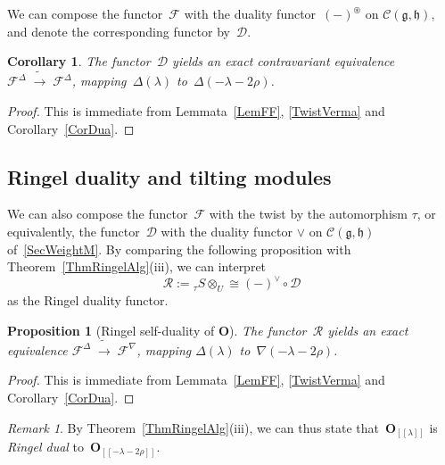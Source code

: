 \documentclass[11pt]{amsart}
\newcommand{\lbra}{[\![}
\newcommand{\rbra}{]\!]}
\newcommand{\FF}{\mathscr{F}}
\newcommand{\RR}{\mathscr{R}}
\newcommand{\DD}{\mathscr{D}}
\newcommand{\cF}{{\mathcal{F}}}
\newcommand{\bO}{\mathbf{O}}
\newcommand{\cC}{\mathcal{C}}
\newcommand{\fg}{\mathfrak{g}}
\newcommand{\fh}{\mathfrak{h}}
\numberwithin{equation}{section}
\theoremstyle{plain}
\newtheorem{prop}[subsubsection]{Proposition}
\newtheorem{cor}[subsubsection]{Corollary}
\theoremstyle{remark}
\newtheorem{rem}[subsubsection]{Remark}
\theoremstyle{remark}
\theoremstyle{construction}
\begin{document}
We can compose the functor~$\FF$ with the duality functor~$(-)^\circledast$ on $\cC(\fg,\fh)$, {and} denote the corresponding functor by~$\DD$. 

\begin{cor}${}$\label{PropRD}
The functor~$\DD$ yields an exact contravariant equivalence ${\cF}^{\Delta}\;\tilde\to\;{\cF}^{\Delta}$, mapping~$\Delta(\lambda)$ to~$\Delta(-\lambda-2\rho)$.
\end{cor}
\begin{proof}
This is immediate from Lemmata~\ref{LemFF}, \ref{TwistVerma} and Corollary~\ref{CorDua}.
\end{proof}

\subsection{Ringel duality and tilting modules}

We can also compose the functor~$\FF$ with the twist by the automorphism $\tau$, or equivalently, the functor~$\DD$ with the duality functor $\vee$ on $\cC(\fg,\fh)$ of~\ref{SecWeightM}. By comparing the following proposition with Theorem~\ref{ThmRingelAlg}(iii), we can interpret 
$$\RR:={}_{\tau}S\otimes_U\cong (-)^\vee\circ\DD$$ as the Ringel duality functor.
\begin{prop}[Ringel self-duality of $\bO$] \label{PropRD}
 The functor~$\RR$ yields an exact equivalence ${\cF}^{\Delta}\;\tilde\to\;{\cF}^{\nabla}$, mapping $\Delta(\lambda)$ to~$\nabla(-\lambda-2\rho)$.
\end{prop}
\begin{proof}
This is immediate from Lemmata~\ref{LemFF}, \ref{TwistVerma} and Corollary~\ref{CorDua}.
\end{proof}


\begin{rem}
By Theorem~\ref{ThmRingelAlg}(iii), we can thus state that~$\bO_{\lbra\lambda\rbra}$ is {\em Ringel dual} to~$\bO_{\lbra-\lambda-2\rho\rbra}$. \end{rem}
\end{document}
